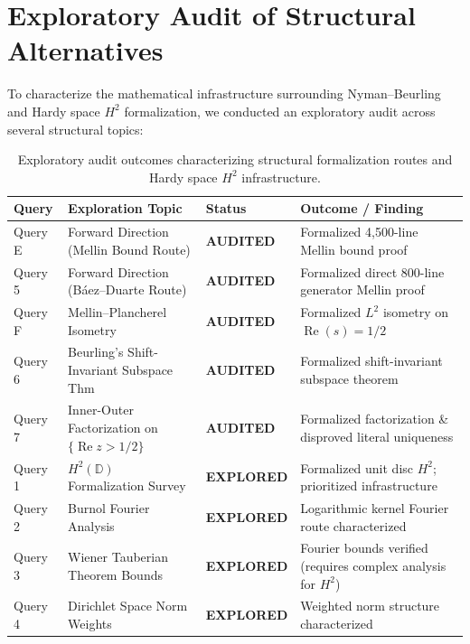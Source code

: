 \documentclass[11pt,a4paper]{article}
\theoremstyle{definition}
\theoremstyle{remark}
\DeclareMathOperator{\RePart}{Re}
\renewcommand{\Re}{\RePart}
\begin{document}
\section{Exploratory Audit of Structural Alternatives}
\label{sec:structural_audit}

To characterize the mathematical infrastructure surrounding Nyman--Beurling and Hardy space $H^2$ formalization, we conducted an exploratory audit across several structural topics:

\begin{table}[htbp]
\centering
\small
\begin{tabular}{llll}
\toprule
\textbf{Query} & \textbf{Exploration Topic} & \textbf{Status} & \textbf{Outcome / Finding} \\
\midrule
Query E & Forward Direction (Mellin Bound Route) & \textbf{AUDITED} & Formalized 4,500-line Mellin bound proof \\
Query 5 & Forward Direction (B\'aez--Duarte Route) & \textbf{AUDITED} & Formalized direct 800-line generator Mellin proof \\
Query F & Mellin--Plancherel Isometry & \textbf{AUDITED} & Formalized $L^2$ isometry on $\Re(s)=1/2$ \\
Query 6 & Beurling's Shift-Invariant Subspace Thm & \textbf{AUDITED} & Formalized shift-invariant subspace theorem \\
Query 7 & Inner-Outer Factorization on $\{\Re z > 1/2\}$ & \textbf{AUDITED} & Formalized factorization \& disproved literal uniqueness \\
Query 1 & $H^2(\mathbb{D})$ Formalization Survey & \textbf{EXPLORED} & Formalized unit disc $H^2$; prioritized infrastructure \\
Query 2 & Burnol Fourier Analysis & \textbf{EXPLORED} & Logarithmic kernel Fourier route characterized \cite{Burnol2002} \\
Query 3 & Wiener Tauberian Theorem Bounds & \textbf{EXPLORED} & Fourier bounds verified (requires complex analysis for $H^2$) \\
Query 4 & Dirichlet Space Norm Weights & \textbf{EXPLORED} & Weighted norm structure characterized \\
\bottomrule
\end{tabular}
\caption{Exploratory audit outcomes characterizing structural formalization routes and Hardy space $H^2$ infrastructure.}
\label{tab:query_audit}
\end{table}
\end{document}
